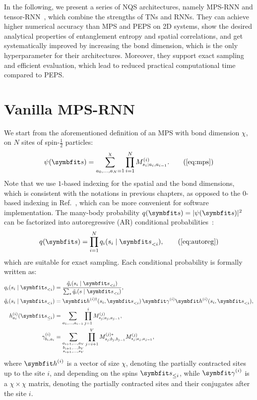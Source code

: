 In the following, we present a series of NQS architectures, namely MPS-RNN and tensor-RNN~\cite{wu2023tensor}, which combine the strengths of TNs and RNNs. They can achieve higher numerical accuracy than MPS and PEPS on 2D systems, show the desired analytical properties of entanglement entropy and spatial correlations, and get systematically improved by increasing the bond dimension, which is the only hyperparameter for their architectures. Moreover, they support exact sampling and efficient evaluation, which lead to reduced practical computational time compared to PEPS.

\section{Vanilla MPS-RNN}

We start from the aforementioned definition of an MPS with bond dimension $\chi$, on $N$ sites of spin-$\frac{1}{2}$ particles:
\begin{equation}
\psi(\vs) = \sum_{a_0, \ldots, a_N = 1}^\chi \prod_{i = 1}^N M^{(i)}_{s_i; a_i, a_{i - 1}}.
\tag{\ref{eq:mps}}
\end{equation}
Note that we use $1$-based indexing for the spatial and the bond dimensions, which is consistent with the notations in previous chapters, as opposed to the $0$-based indexing in Ref.~\cite{wu2023tensor}, which can be more convenient for software implementation. The many-body probability $q(\vs) = |\psi(\vs)|^2$ can be factorized into autoregressive (AR) conditional probabilities~\cite{ferris2012perfect, han2018unsupervised, wei2022sequential}:
\begin{equation}
q(\vs) = \prod_{i = 1}^N q_i(s_i \mid \vs_{< i}),
\tag{\ref{eq:autoreg}}
\end{equation}
which are suitable for exact sampling. Each conditional probability is formally written as:
\begin{align}
q_i(s_i \mid \vs_{< i}) &=
\frac{\tilde{q}_i(s_i \mid \vs_{< i})}{\sum_s \tilde{q}_i(s \mid \vs_{< i})}, \\
\tilde{q}_i(s_i \mid \vs_{< i}) &=
\vh^{(i) \dagger}(s_i, \vs_{< i})\,\mga^{(i)} \vh^{(i)}(s_i, \vs_{< i}), \label{eq:mps-cond-prob} \\
h^{(i)}_{a_i}(\vs_{\le i}) &=
\sum_{a_1, \ldots, a_{i - 1}}
\prod_{j = 1}^i M^{(j)}_{s_j; a_j, a_{j - 1}}, \\
\gamma^{(i)}_{b_i, a_i} &=
\sum_{\substack{a_{i + 1}, \ldots, a_V \\ b_{i + 1}, \ldots, b_V \\ s_{i + 1}, \ldots, s_V}}
\prod_{j = i + 1}^V M^{(j) *}_{s_j; b_j, b_{j - 1}} M^{(j)}_{s_j; a_j, a_{j - 1}}, \label{eq:mps-gamma}
\end{align}
where $\vh^{(i)}$ is a vector of size $\chi$, denoting the partially contracted sites up to the site $i$, and depending on the spins $\vs_{\le i}$, while $\mga^{(i)}$ is a $\chi \times \chi$ matrix, denoting the partially contracted sites and their conjugates after the site $i$.

